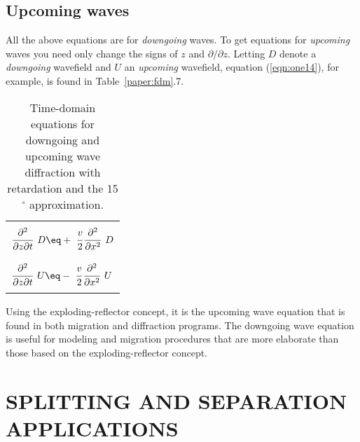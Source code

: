 {\subsection{Upcoming waves}
\par
All the above equations are for 
{\em  downgoing}
waves.
To get equations for
{\em  upcoming}
waves you need only change the
signs of  $z$  and  $ \partial / \partial z $.
Letting  $D$  denote a 
{\em  downgoing}
wavefield and  $U$  an
{\em  upcoming}
wavefield, equation (\ref{eqn:one14}), for example,
is found in Table~\ref{paper:fdm}.7.
\begin{table}
\begin{center}
\begin{tabular}{|l|}     \hline
      \\
$\displaystyle {\strut\partial^2 \over
  \partial z \partial t} \ D \eq
  +\ \displaystyle {\strut v\over 2} 
  \displaystyle {\strut\partial^2 \over\partial x^2} \ D$
     \hspace{.2in} \\
       \\   \hline
       \\
$\displaystyle {\strut\partial^2 \over
  \partial z \partial t} \ U \eq
  -\ \displaystyle {\strut v\over 2} 
  \displaystyle {\strut\partial^2 \over\partial x^2} \ U$
     \hspace{.2in} \\
        \\      \hline
\end{tabular}
\end{center}
\label{eqn:1-6}
\caption{Time-domain equations
for downgoing and upcoming wave diffraction with
retardation and the 15$^\circ$ approximation.}
\end{table}
\par
Using the exploding-reflector concept,
it is the upcoming
wave equation that is found in both migration and diffraction programs.
The downgoing wave equation is useful
for modeling and migration procedures that are more elaborate
than those based on the exploding-reflector concept.
\section{SPLITTING AND SEPARATION APPLICATIONS}
}
